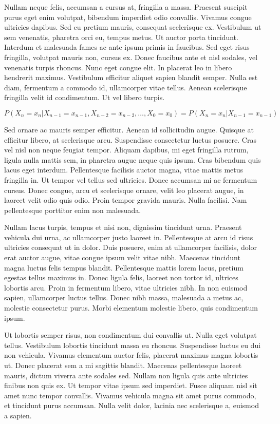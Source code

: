 \documentclass[thesismargins, thesislinespacing, twoside, upjsfrontpage]{rnthesis}
\begin{document}
Nullam neque felis, accumsan a cursus at, fringilla a massa. Praesent suscipit purus eget enim volutpat, bibendum imperdiet odio convallis. Vivamus congue ultricies dapibus. Sed eu pretium mauris, consequat scelerisque ex. Vestibulum ut sem venenatis, pharetra orci eu, tempus metus. Ut auctor porta tincidunt. Interdum et malesuada fames ac ante ipsum primis in faucibus. Sed eget risus fringilla, volutpat mauris non, cursus ex. Donec faucibus ante et nisl sodales, vel venenatis turpis rhoncus. Nunc eget congue elit. In placerat leo in libero hendrerit maximus. Vestibulum efficitur aliquet sapien blandit semper. Nulla est diam, fermentum a commodo id, ullamcorper vitae tellus. Aenean scelerisque fringilla velit id condimentum. Ut vel libero turpis.

\begin{equation}
P(X_n = x_n | X_{n - 1} = x_{n - 1}, X_{n - 2} = x_{n - 2}, \dots, X_0 = x_0) = P(X_n = x_n | X_{n - 1} = x_{n - 1})
\end{equation}

Sed ornare ac mauris semper efficitur. Aenean id sollicitudin augue. Quisque at efficitur libero, at scelerisque arcu. Suspendisse consectetur luctus posuere. Cras vel nisl non neque feugiat tempor. Aliquam dapibus, mi eget fringilla rutrum, ligula nulla mattis sem, in pharetra augue neque quis ipsum. Cras bibendum quis lacus eget interdum. Pellentesque facilisis auctor magna, vitae mattis metus fringilla in. Ut tempor vel tellus sed ultricies. Donec accumsan mi ac fermentum cursus. Donec congue, arcu et scelerisque ornare, velit leo placerat augue, in laoreet velit odio quis odio. Proin tempor gravida mauris. Nulla facilisi. Nam pellentesque porttitor enim non malesuada.

Nullam lacus turpis, tempus et nisi non, dignissim tincidunt urna. Praesent vehicula dui urna, ac ullamcorper justo laoreet in. Pellentesque at arcu id risus ultricies consequat ut in dolor. Duis posuere, enim at ullamcorper facilisis, dolor erat auctor augue, vitae congue ipsum velit vitae nibh. Maecenas tincidunt magna luctus felis tempus blandit. Pellentesque mattis lorem lacus, pretium egestas tellus maximus in. Donec ligula felis, laoreet non tortor id, ultrices lobortis arcu. Proin in fermentum libero, vitae ultricies nibh. In non euismod sapien, ullamcorper luctus tellus. Donec nibh massa, malesuada a metus ac, molestie consectetur purus. Morbi elementum molestie libero, quis condimentum ipsum.

Ut lobortis semper risus, non condimentum dui convallis ut. Nulla eget volutpat tellus. Vestibulum lobortis tincidunt massa eu rhoncus. Suspendisse luctus eu dui non vehicula. Vivamus elementum auctor felis, placerat maximus magna lobortis ut. Donec placerat sem a mi sagittis blandit. Maecenas pellentesque laoreet mauris, dictum viverra ante sodales sed. Nullam non ligula quis ante ultricies finibus non quis ex. Ut tempor vitae ipsum sed imperdiet. Fusce aliquam nisl sit amet nunc tempor convallis. Vivamus vehicula magna sit amet purus commodo, et tincidunt purus accumsan. Nulla velit dolor, lacinia nec scelerisque a, euismod a sapien. 
\end{document}
